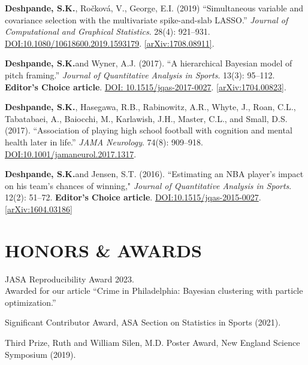 \documentclass[margin]{res}
\def\skd{\textbf{Deshpande, S.K.}}
\begin{document}
\begin{resume}
\skd, Ro\v{c}kov\'{a}, V.,  George, E.I. (2019) ``Simultaneous variable and covariance selection with the multivariate spike-and-slab LASSO.'' \textit{Journal of Computational and Graphical Statistics}. 28(4): 921--931. \href{https://doi.org/10.1080/10618600.2019.1593179}{DOI:10.1080/10618600.2019.1593179}. \href{https://arxiv.org/abs/1708.08911}{[arXiv:1708.08911]}. %

\skd and Wyner, A.J. (2017). ``A hierarchical Bayesian model of pitch framing.'' \textit{Journal of Quantitative Analysis in Sports}. 13(3): 95--112. \textbf{Editor's Choice article}.   \href{https://doi.org/10.1515/jqas-2017-0027}{DOI: 10.1515/jqas-2017-0027}. \href{https://arxiv.org/abs/1704.00823}{[arXiv:1704.00823]}.

\skd, Hasegawa, R.B., Rabinowitz, A.R., Whyte, J., Roan, C.L., Tabatabaei, A., Baiocchi, M., Karlawish, J.H., Master, C.L., and Small, D.S. (2017). ``Association of playing high school football with cognition and mental health later in life.'' \textit{JAMA Neurology}. 74(8): 909--918. \href{https://doi.org/10.1001/jamaneurol.2017.1317}{DOI:10.1001/jamaneurol.2017.1317}.

\skd and Jensen, S.T. (2016). ``Estimating an NBA player's impact on his team's chances of winning," \textit{Journal of Quantitative Analysis in Sports}. 12(2): 51--72. \textbf{Editor's Choice article}.  \href{https://doi.org/10.1515/jqas-2015-0027}{DOI:10.1515/jqas-2015-0027}.\href{https://arxiv.org/abs/1604.03186}{[arXiv:1604.03186]}


\section{HONORS \& AWARDS} 

JASA Reproducibility Award 2023. \\
Awarded for our article ``Crime in Philadelphia: Bayesian clustering with particle optimization.''

Significant Contributor Award, ASA Section on Statistics in Sports (2021).

Third Prize, Ruth and William Silen, M.D. Poster Award, New England Science Symposium (2019).


\end{resume}
\end{document}
